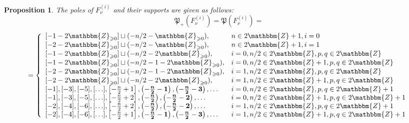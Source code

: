 \documentclass{article}
\newcommand{\nocomma}{}
\newcommand{\tmmathbf}[1]{\ensuremath{\boldsymbol{#1}}}
\numberwithin{definition}{section}
\numberwithin{lemma}{section}
\newtheorem{proposition}{Proposition}
\numberwithin{proposition}{section}
{\theorembodyfont{\rmfamily}\newtheorem{remark}{Remark}
\numberwithin{remark}{section}
}
\begin{document}
\begin{proposition}
  The poles of $F_{\nu}^{( i)}$ and their supports are given as follows:
  \[ \mathfrak{P}_+ ( F_{\nu}^{( i)}) =\mathfrak{P} ( F_{\nu}^{( i)}) = \]
  \[ = \left\{ \begin{array}{ll}
       {}[ - 1 - 2\mathbbm{Z}_{\geqslant 0}] \sqcup ( - n / 2
       -\mathbbm{Z}_{\geqslant 0}), & n \in 2\mathbbm{Z}+ 1 \nocomma \nocomma,
       i = 0\\
       {}[ - 2 - 2\mathbbm{Z}_{\geqslant 0}] \sqcup ( - n / 2
       -\mathbbm{Z}_{\geqslant 0}), & n \in 2\mathbbm{Z}+ 1, i = 1\\
       {}[ - 1 - 2\mathbbm{Z}_{\geqslant 0}] \sqcup ( - n / 2 -
       2\mathbbm{Z}_{\geqslant 0}), & i = 0, n / 2 \in 2\mathbbm{Z}, p, q \in
       2\mathbbm{Z}\\
       {}[ - 1 - 2\mathbbm{Z}_{\geqslant 0}] \sqcup ( - n / 2 - 1 -
       2\mathbbm{Z}_{\geqslant 0}), & i = 0, n / 2 \in 2\mathbbm{Z}+ 1, p, q
       \in 2\mathbbm{Z}\\
       {}[ - 2 - 2\mathbbm{Z}_{\geqslant 0}] \sqcup ( - n / 2 - 1 -
       2\mathbbm{Z}_{\geqslant 0}), & i = 1, n / 2 \in 2\mathbbm{Z}, p, q \in
       2\mathbbm{Z}\\
       {}[ - 2 - 2\mathbbm{Z}_{\geqslant 0}] \sqcup ( - n / 2 -
       2\mathbbm{Z}_{\geqslant 0}), & i = 1, n / 2 \in 2\mathbbm{Z}+ 1, p, q
       \in 2\mathbbm{Z}\\
       {}[ - 1], [ - 3], [ - 5], [ \ldots], \left[ - \frac{n}{2} + 1 \right],
       \left( {{- \frac{\tmmathbf{n}}{\tmmathbf{2}}
       -\tmmathbf{1}}} \right), \left( - \frac{\tmmathbf{n}}{\tmmathbf{2}}
       -\tmmathbf{3} \right), \ldots & i = 0, n / 2 \in 2\mathbbm{Z}, p, q \in
       2\mathbbm{Z}+ 1\\
       {}[ - 1], [ - 3], [ - 5], [ \ldots], \left[ - \frac{n}{2} + 2 \right],
       \left( - \frac{\tmmathbf{n}}{\tmmathbf{2}} \right), \left( -
       \frac{\tmmathbf{n}}{\tmmathbf{2}} -\tmmathbf{2} \right), \ldots & i =
       0, n / 2 \in 2\mathbbm{Z}+ 1, p, q \in 2\mathbbm{Z}+ 1\\
       {}[ - 2], [ - 4], [ - 6], [ \ldots], \left[ - \frac{n}{2} + 2 \right],
       \left( - \frac{\tmmathbf{n}}{\tmmathbf{2}} \right), \left( -
       \frac{\tmmathbf{n}}{\tmmathbf{2}} -\tmmathbf{2} \right), \ldots & i =
       1, n / 2 \in 2\mathbbm{Z}, p, q \in 2\mathbbm{Z}+ 1\\
       {}[ - 2], [ - 4], [ - 6], [ \ldots], \left[ - \frac{n}{2} + 1 \right],
       \left( {{- \frac{\tmmathbf{n}}{\tmmathbf{2}}
       -\tmmathbf{1}}} \right), \left( - \frac{\tmmathbf{n}}{\tmmathbf{2}}
       -\tmmathbf{3} \right), \ldots & i = 1, n / 2 \in 2\mathbbm{Z}+ 1, p, q
       \in 2\mathbbm{Z}+ 1
     \end{array} \right. \]
  

\end{proposition}
\end{document}
